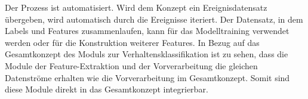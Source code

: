 Der Prozess ist automatisiert. Wird dem Konzept ein Ereignisdatensatz übergeben, wird automatisch durch die Ereignisse iteriert. Der Datensatz, in dem Labels und Features zusammenlaufen, kann für das Modelltraining verwendet werden oder für die Konstruktion weiterer Features. In Bezug auf das Gesamtkonzept des Moduls zur Verhaltensklassifikation ist zu sehen, dass die Module der Feature-Extraktion und der Vorverarbeitung die gleichen Datenströme erhalten wie die Vorverarbeitung im Gesamtkonzept. Somit sind diese Module direkt in das Gesamtkonzept integrierbar.